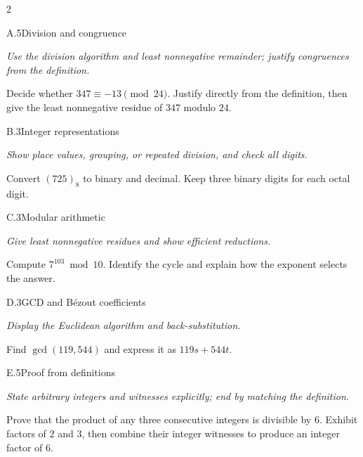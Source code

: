 \documentclass[9pt]{extarticle}
\begin{document}
\begin{multicols}{2}
\begin{CoreProblem}{A.5}{Division and congruence}
{\scriptsize\textit{Use the division algorithm and least nonnegative remainder; justify congruences from the definition.}\par}
Decide whether $347\equiv-13\pmod{24}$. Justify directly from the definition,
then give the least nonnegative residue of $347$ modulo $24$.
\end{CoreProblem}
\begin{CoreProblem}{B.3}{Integer representations}
{\scriptsize\textit{Show place values, grouping, or repeated division, and check all digits.}\par}
Convert $(725)_8$ to binary and decimal. Keep three binary digits for each
octal digit.
\end{CoreProblem}
\begin{CoreProblem}{C.3}{Modular arithmetic}
{\scriptsize\textit{Give least nonnegative residues and show efficient reductions.}\par}
Compute $7^{103}\bmod10$. Identify the cycle and explain how the exponent
selects the answer.
\end{CoreProblem}
\columnbreak
\begin{CoreProblem}{D.3}{GCD and B\'ezout coefficients}
{\scriptsize\textit{Display the Euclidean algorithm and back-substitution.}\par}
Find $\gcd(119,544)$ and express it as $119s+544t$.
\end{CoreProblem}
\begin{CoreProblem}{E.5}{Proof from definitions}
{\scriptsize\textit{State arbitrary integers and witnesses explicitly; end by matching the definition.}\par}
Prove that the product of any three consecutive integers is divisible by $6$.
Exhibit factors of $2$ and $3$, then combine their integer witnesses to
produce an integer factor of $6$.
\end{CoreProblem}
\end{multicols}
\CoreWorkArea
\FormBreak
{}
\end{document}
